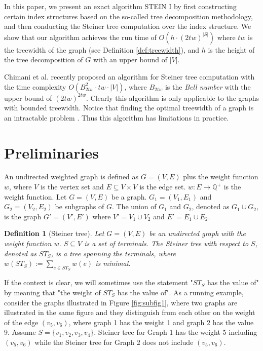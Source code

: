 \documentclass[preprint,12pt]{elsarticle}
\newtheorem{definition}{Definition}
\begin{document}
In this paper, we present an exact algorithm STEIN I  by first constructing 
certain index structures based on the so-called tree decomposition methodology,
and then conducting  the Steiner tree computation 
over the index structure.
We show that our algorithm achieves the run time of
$O(h \cdot (2tw)^{|S|})$ where $tw$ is the treewidth of the graph (see Definition \ref{def:treewidth}),
 and $h$ is the height of the tree decomposition
of $G$ with an upper bound of $|V|$.


Chimani et al. \cite{ChimaniMZ12} recently proposed an algorithm for Steiner tree computation
with the time complexity  
$O(B_{2tw}^2 \cdot tw \cdot |V|)$, where 
$B_{2tw}$ is the \emph{Bell number} with the upper bound of $(2tw)^{2tw}$. 
Clearly this algorithm is only applicable to the graphs with bounded treewidth.
Notice that finding the optimal treewidth of a graph is an intractable problem \cite{Bodlaender93atourist}.
Thus
this algorithm has limitations in practice.



\section{Preliminaries}
\label{sec:pre}
An undirected weighted graph is defined as $G = (V,E)$ plus the weight function $w$, where $V$ is the vertex set and $E \subseteq V \times V$ is the edge set. $w: E \rightarrow \mathbb{Q}^+$ is the weight function. 
Let $G=(V,E)$ be a graph. $G_1=(V_1,E_1)$ and $G_2=(V_2,E_2)$ be subgraphs
of $G$. The union of $G_1$ and $G_2$, denoted as $G_1 \cup G_2$,
is the graph $G'=(V',E')$ where $V' = V_1 \cup V_2$ and $E' = E_1 \cup E_2$.



\begin{definition} [Steiner tree]
Let  $G = (V,E)$ be an undirected graph with the weight function $w$. $S \subseteq V$ 
is a set of terminals. The Steiner tree with respect to $S$,
denoted as $ST_S$, is a tree 
spanning the terminals, where $w(ST_S) := \sum_{e \in ST_S}w(e)$ is minimal.
\end{definition}

If the context is clear, we will  sometimes use the statement  "$ST_S$ has the value of" by meaning that "the weight of $ST_S$ has the value of".
As a running example, consider the graphs illustrated in  Figure \ref{fig:subfig1},
where two graphs are illustrated in the same figure and they distinguish from each other on the 
weight of the edge $(v_5,v_6)$, where graph 1 has the weight 1 and graph 2 has the value  9.
Assume  $S=\{v_1, v_2, v_3, v_4\}$.
Steiner tree for Graph 1 has the weight 5 including $(v_5,v_6)$ while the Steiner tree for Graph 2 does not include $(v_5,v_6)$.
\end{document}
